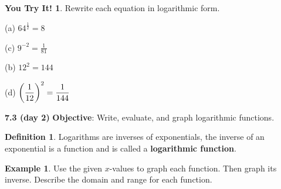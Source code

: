 \documentclass{report}
\theoremstyle{definition}
\newtheorem{example}{\bf Example}
\newtheorem{youtry}{\bf You Try It!}
\newtheorem{definition}{\bf Definition}[section]
\begin{document}
\begin{youtry}
Rewrite each equation in logarithmic form.
\end{youtry}

\begin{minipage}[t]{0.45\linewidth}
(a) $64^{\frac{1}{2}}=8$\\

\vspace{3cm}

(c) $9^{-2}=\displaystyle\frac{1}{81}$\\

\vspace{3cm}

\end{minipage}
\hfill
\begin{minipage}[t]{0.45\linewidth}
(b) $12^2=144$\\

\vspace{3cm}

(d) $\bigg{(}\displaystyle\frac{1}{12}\bigg{)}^2=\frac{1}{144}$\\

\vspace{3cm}
\end{minipage}


 
 \noindent{}
 
 
 \newpage





 \newpage

\noindent\Large{\textbf{7.3 (day 2)}} 
  \indent\hfill\small\noindent \textbf{Objective}: Write, evaluate, and graph logarithmic functions.  \normalsize\\

 
 \begin{definition}
 Logarithms are inverses of exponentials, the inverse of an exponential is a function and is called a \textbf{logarithmic function}.
 \end{definition}
 
 \begin{example}
Use the given $x$-values to graph each function. Then graph its inverse. Describe the domain and range for each function.
 \end{example}
 
\end{document}
